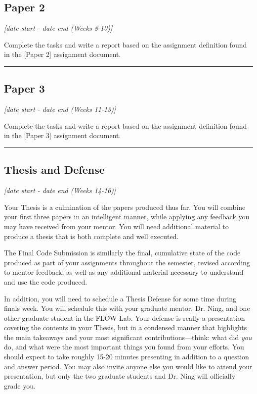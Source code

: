 \documentclass[12pt]{article}
\begin{document}
\subsection{Paper 2}
\label{ssec:p2}

\textit{[date start - date end (Weeks 8-10)]}

\bigskip

Complete the tasks and write a report based on the assignment definition found in the [Paper 2] assignment document.



\vspace{1em}\hrule\vspace{1em}
\subsection{Paper 3}
\label{ssec:p3}

\textit{[date start - date end (Weeks 11-13)]}

\bigskip

Complete the tasks and write a report based on the assignment definition found in the [Paper 3] assignment document.

\bigskip


\vspace{1em}\hrule\vspace{1em}
\subsection{Thesis and Defense}
\label{sec:finalreport}

\textit{[date start - date end (Weeks 14-16)]}

\bigskip

Your Thesis is a culmination of the papers produced thus far.
You will combine your first three papers in an intelligent manner, while applying any feedback you may have received from your mentor. 
You will need additional material to produce a thesis that is both complete and well executed. 

The Final Code Submission is similarly the final, cumulative state of the code produced as part of your assignments throughout the semester, revised according to mentor feedback, as well as any additional material necessary to understand and use the code produced.

In addition, you will need to schedule a Thesis Defense for some time during finals week.
You will schedule this with your graduate mentor, Dr. Ning, and one other graduate student in the FLOW Lab.
Your defense is really a presentation covering the contents in your Thesis, but in a condensed manner that highlights the main takeaways and your most significant contributions---think: what did \textit{you} do, and what were the most important things you found from your efforts.
You should expect to take roughly 15-20 minutes presenting in addition to a question and answer period.
You may also invite anyone else you would like to attend your presentation, but only the two graduate students and Dr. Ning will officially grade you.
\end{document}
